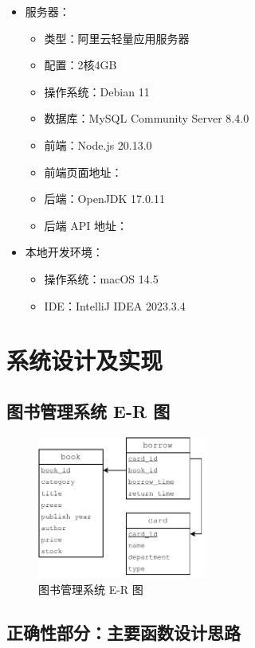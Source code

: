 \documentclass[a4paper,oneside]{ctexbook}
\begin{document}
\begin{itemize}
    \item 服务器：
    \begin{itemize}
        \item 类型：阿里云轻量应用服务器
        \item 配置：2核4GB
        \item 操作系统：Debian 11
        \item 数据库：MySQL Community Server 8.4.0
        \item 前端：Node.js 20.13.0
        \item 前端页面地址：
        \item 后端：OpenJDK 17.0.11
        \item 后端 API 地址：
    \end{itemize}
    \item 本地开发环境：
    \begin{itemize}
        \item 操作系统：macOS 14.5
        \item IDE：IntelliJ IDEA 2023.3.4
    \end{itemize}
\end{itemize}

\chapter{系统设计及实现}

\section{图书管理系统 E-R 图}

\begin{figure}[h!]
    \centering
    \includegraphics[width=0.5\textwidth]{e-r}
    \caption{图书管理系统 E-R 图}
    \label{fig:e-r}
\end{figure}

\section{正确性部分：主要函数设计思路}
\end{document}

